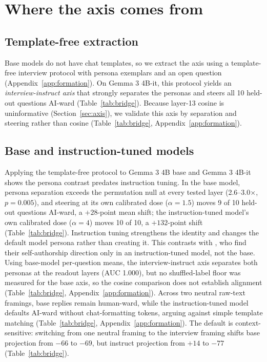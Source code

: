\section{Where the axis comes from}
\label{sec:formation}

\subsection{Template-free extraction}

Base models do not have chat templates, so we extract the axis using a
template-free interview protocol with persona exemplars and an open question
(Appendix~\ref{app:formation}). On Gemma 3 4B-it, this protocol yields an
\emph{interview-instruct axis} that strongly separates the personas and
steers all 10 held-out questions AI-ward (Table~\ref{tab:bridge}). Because
layer-13 cosine is uninformative (Section~\ref{sec:axis}), we validate this
axis by separation and steering rather than cosine (Table~\ref{tab:bridge},
Appendix~\ref{app:formation}).

\subsection{Base and instruction-tuned models}

Applying the template-free protocol to Gemma 3 4B base and Gemma 3 4B-it shows the persona
contrast predates instruction tuning. In the base model, persona separation exceeds the
permutation null at every tested layer (2.6--3.0$\times$, $p=0.005$), and
steering at its own calibrated dose ($\alpha=1.5$) moves 9 of 10 held-out
questions AI-ward, a $+28$-point mean shift; the instruction-tuned model's
own calibrated dose ($\alpha=4$) moves 10 of 10, a $+132$-point shift
(Table~\ref{tab:bridge}). Instruction tuning strengthens the identity and
changes the default model persona rather than creating it. This contrasts
with \citet{ackerman2024inspection}, who find their self-authorship
direction only in an instruction-tuned model, not the base.
Using base-model per-question means, the interview-instruct axis separates both
personas at the readout layers (AUC 1.000), but no shuffled-label floor was measured
for the base axis, so the cosine comparison does not establish alignment
(Table~\ref{tab:bridge}, Appendix~\ref{app:formation}). Across two neutral
raw-text framings, base replies remain human-ward, while
the instruction-tuned model defaults AI-ward without chat-formatting tokens,
arguing against simple template matching (Table~\ref{tab:bridge},
Appendix~\ref{app:formation}). The default is context-sensitive: switching
from one neutral framing to the interview framing shifts base projection from
$-66$ to $-69$, but instruct projection from $+14$ to $-77$
(Table~\ref{tab:bridge}).

